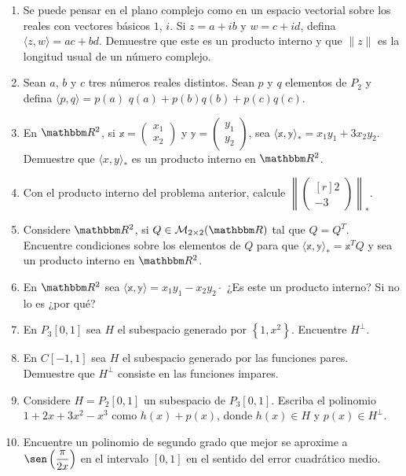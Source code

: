 \begin{enumerate}[start=62]
    \newpage
    \item Se puede pensar en el plano complejo como en un espacio vectorial sobre los reales con vectores básicos $1$, $i$. Si $z=a+i b$ y $w=c+i d$, defina $\langle z, w\rangle=a c+b d$. Demuestre que este es un producto interno y que $\|z\|$ es la longitud usual de un número complejo.
    \item Sean $a$, $b$ y $c$ tres números reales distintos. Sean $p$ y $q$ elementos de $P_{2}$ y defina $\langle p, q\rangle=p(a)$ $q(a)+p(b) q(b)+p(c) q(c)$.
    \item En $\RR[2]$, si $\mathbb{x}=\begin{pmatrix} x_{1} \\ x_{2}\end{pmatrix}$ y $\mathbb{y}=\begin{pmatrix} y_{1} \\ y_{2}\end{pmatrix}$, sea $\langle \mathbb{x}, \mathbb{y}\rangle_{*}=x_{1} y_{1}+3 x_{2} y_{2}$. Demuestre que $\langle x, y \rangle_{*}$ es un producto interno en $\RR[2]$.
    \item Con el producto interno del problema anterior, calcule $\left\| \begin{pmatrix*}[r] 2 \\ -3 \end{pmatrix*}\right\|_{*}$.
    \item Considere $\RR[2]$, si $Q \in \mathcal{M}_{2 \times 2}(\RR)$ tal que $Q=Q^{T}$. Encuentre condiciones sobre los elementos de $Q$ para que $\langle\mathbb{x}, \mathbb{y}\rangle_{*}=\mathbb{x}^{T} Q$ y sea un producto interno en $\RR[2]$.
    \item En $\RR[2]$ sea $\langle \mathbb{x}, \mathbb{y} \rangle = x_{1} y_{1}-x_{2} y_{2} \cdot$ ¿Es este un producto interno? Si no lo es ¿por qué?
    \item En $P_{3}[0,1]$ sea $H$ el subespacio generado por $\left\{1, x^{2}\right\}$. Encuentre $H^{\perp}$.
    \item En $C[-1,1]$ sea $H$ el subespacio generado por las funciones pares. Demuestre que $H^{\perp}$ consiste en las funciones impares.
    \item Considere $H=P_{2}[0,1]$ un subespacio de $P_{3}[0,1]$. Escriba el polinomio $1+2 x+3 x^{2}-x^{3}$ como $h(x)+p(x)$, donde $h(x) \in H$ y $p(x) \in H^{\perp}$.
    \item Encuentre un polinomio de segundo grado que mejor se aproxime a $\sen \left( \dfrac{\pi}{2 x} \right)$ en el intervalo $[0,1]$ en el sentido del error cuadrático medio.

\end{enumerate}

